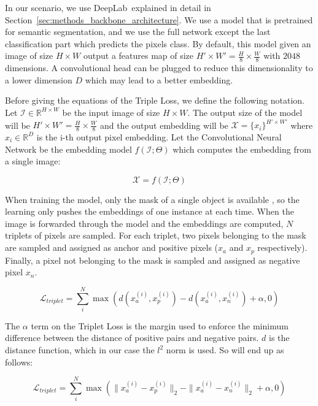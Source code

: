 In our scenario, we use DeepLab~\deeplab explained in detail in Section~\ref{sec:methods_backbone_architecture}.
We use a model that is pretrained for semantic segmentation, and we use the full network except the last classification part which predicts the pixels class.
By default, this model given an image of size $H \times W$ output a features map of size $H' \times W' = \frac{H}{8} \times \frac{W}{8}$ with $2048$ dimensions.
A convolutional head can be plugged to reduce this dimensionality to a lower dimension $D$ which may lead to a better embedding.

Before giving the equations of the Triple Loss, we define the following notation.
Let $\mathcal{I} \in \mathbb{R}^{H \times W}$ be the input image of size $H \times W$.
The output size of the model will be $H' \times W' = \frac{H}{8} \times \frac{W}{8}$ and the output embedding will be $\mathcal{X} = \{x_i\}^{H' \times W'}$ where $x_i \in \mathbb{R}^D$ is the i-th output pixel embedding.
Let the Convolutional Neural Network be the embedding model $f(\mathcal{I}; \Theta)$ which computes the embedding from a single image:

\begin{equation}
  \mathcal{X} = f(\mathcal{I}; \Theta)
\end{equation}

When training the model,
only the mask of a single object is available , so the learning only pushes the embeddings of one instance at each time.
When the image is forwarded through the model and the embeddings are computed, $N$ triplets of pixels are sampled.
For each triplet, two pixels belonging to the mask are sampled and assigned as anchor and positive pixels ($x_a$ and $x_p$ respectively).
Finally, a pixel not belonging to the mask is sampled and assigned as negative pixel $x_n$.

\begin{equation}
  \label{eq:triplet_loss_1}
  \mathcal{L}_{triplet} = \sum_i^N \max \left( d(x_a^{(i)}, x_p^{(i)}) - d(x_a^{(i)}, x_n^{(i)})  + \alpha, 0 \right)
\end{equation}

The $\alpha$ term on the Triplet Loss is the margin used to enforce the minimum difference between the distance of positive pairs and negative pairs.
$d$ is the distance function, which in our case the $l^2$ norm is used.
So  will end up as follows:

\begin{equation}
  \label{eq:triplet_loss_2}
  \mathcal{L}_{triplet} =
	\sum_i^N \max \left(
		\|x_a^{(i)} - x_p^{(i)}\|_2 - \|x_a^{(i)} - x_n^{(i)}\|_2  + \alpha,
		0 \right)
\end{equation}

